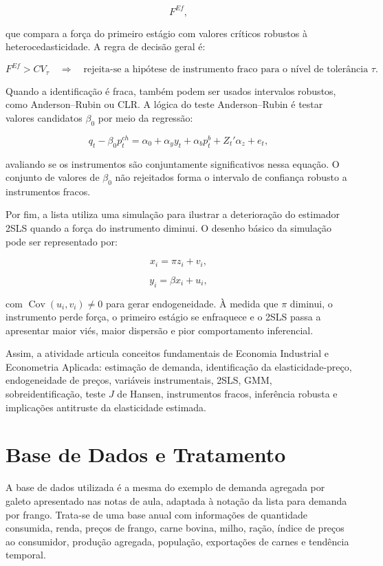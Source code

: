\documentclass[12pt,a4paper]{article}
\begin{document}
\[
F^{Ef},
\tag{17}
\label{eq:f_efetivo}
\]

que compara a força do primeiro estágio com valores críticos robustos à heterocedasticidade. A regra de decisão geral é:

\[
F^{Ef} > CV_{\tau}
\quad \Rightarrow \quad
\text{rejeita-se a hipótese de instrumento fraco para o nível de tolerância } \tau.
\tag{18}
\label{eq:regra_mop}
\]

Quando a identificação é fraca, também podem ser usados intervalos robustos, como Anderson--Rubin ou CLR. A lógica do teste Anderson--Rubin é testar valores candidatos \(\beta_0\) por meio da regressão:

\[
q_t - \beta_0 p^{ch}_t
=
\alpha_0 + \alpha_y y_t + \alpha_b p^b_t + Z_t'\alpha_z + e_t,
\tag{19}
\label{eq:ar}
\]

avaliando se os instrumentos são conjuntamente significativos nessa equação. O conjunto de valores de \(\beta_0\) não rejeitados forma o intervalo de confiança robusto a instrumentos fracos.

Por fim, a lista utiliza uma simulação para ilustrar a deterioração do estimador 2SLS quando a força do instrumento diminui. O desenho básico da simulação pode ser representado por:

\[
x_i = \pi z_i + v_i,
\tag{20}
\label{eq:sim_primeiro_estagio}
\]

\[
y_i = \beta x_i + u_i,
\tag{21}
\label{eq:sim_estrutural}
\]

com \(\operatorname{Cov}(u_i,v_i)\neq 0\) para gerar endogeneidade. À medida que \(\pi\) diminui, o instrumento perde força, o primeiro estágio se enfraquece e o 2SLS passa a apresentar maior viés, maior dispersão e pior comportamento inferencial.

Assim, a atividade articula conceitos fundamentais de Economia Industrial e Econometria Aplicada: estimação de demanda, identificação da elasticidade-preço, endogeneidade de preços, variáveis instrumentais, 2SLS, GMM, sobreidentificação, teste \(J\) de Hansen, instrumentos fracos, inferência robusta e implicações antitruste da elasticidade estimada.

\section{Base de Dados e Tratamento}

A base de dados utilizada é a mesma do exemplo de demanda agregada por galeto apresentado nas notas de aula, adaptada à notação da lista para demanda por frango. Trata-se de uma base anual com informações de quantidade consumida, renda, preços de frango, carne bovina, milho, ração, índice de preços ao consumidor, produção agregada, população, exportações de carnes e tendência temporal.
\end{document}
